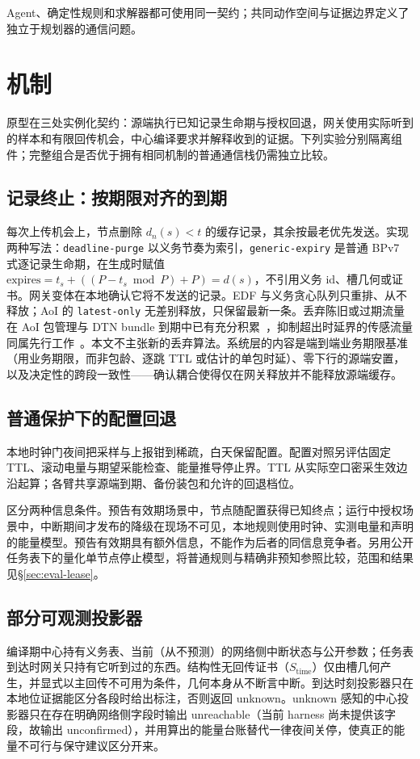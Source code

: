 \documentclass[11pt]{article}
\newcommand{\stime}{$S_{\mathrm{time}}$\xspace}
\begin{document}
Agent、确定性规则和求解器都可使用同一契约；共同动作空间与证据边界定义了独立于规划器的通信问题。

\section{机制}
\label{sec:mech}
原型在三处实例化契约：源端执行已知记录生命期与授权回退，网关使用实际听到的样本和有限回传机会，中心编译要求并解释收到的证据。下列实验分别隔离组件；完整组合是否优于拥有相同机制的普通通信栈仍需独立比较。

\subsection{记录终止：按期限对齐的到期}
\label{sec:mech-record}
每次上传机会上，节点删除 $d_n(s)<t$ 的缓存记录，其余按最老优先发送。实现两种写法：\texttt{deadline-purge} 以义务节奏为索引，\texttt{generic-expiry} 是普通 BPv7 式逐记录生命期，在生成时赋值 $\text{expires}=t_s+((P-t_s\bmod P)+P)=d(s)$，不引用义务 id、槽几何或证书。网关变体在本地确认它将不发送的记录。EDF 与义务贪心队列只重排、从不释放；AoI 的 \texttt{latest-only} 无差别释放，只保留最新一条。丢弃陈旧或过期流量在 AoI 包管理与 DTN bundle 到期中已有充分积累~\cite{costa2014pm,kam2016deadline,dtnarch,rfc9171}，抑制超出时延界的传感流量同属先行工作~\cite{wada2009timeout}。本文不主张新的丢弃算法。系统层的内容是端到端业务期限基准（用业务期限，而非包龄、逐跳 TTL 或估计的单包时延）、零下行的源端安置，以及决定性的跨段一致性——确认耦合使得仅在网关释放并不能释放源端缓存。

\subsection{普通保护下的配置回退}
\label{sec:mech-lease}
本地时钟门夜间把采样与上报钳到稀疏，白天保留配置。配置对照另评估固定 TTL、滚动电量与期望采能检查、能量推导停止界。TTL 从实际空口密采生效边沿起算；各臂共享源端到期、备份装包和允许的回退档位。

区分两种信息条件。预告有效期场景中，节点随配置获得已知终点；运行中授权场景中，中断期间才发布的降级在现场不可见，本地规则使用时钟、实测电量和声明的能量模型。预告有效期具有额外信息，不能作为后者的同信息竞争者。另用公开任务表下的量化单节点停止模型，将普通规则与精确非预知参照比较，范围和结果见\S\ref{sec:eval-lease}。

\subsection{部分可观测投影器}
\label{sec:mech-projector}
编译期中心持有义务表、当前（从不预测）的网络侧中断状态与公开参数；任务表到达时网关只持有它听到过的东西。结构性无回传证书（\stime）仅由槽几何产生，并显式以主回传不可用为条件，几何本身从不断言中断。到达时刻投影器只在本地位证据能区分各段时给出标注，否则返回 unknown。unknown 感知的中心投影器只在存在明确网络侧字段时输出 unreachable（当前 harness 尚未提供该字段，故输出 unconfirmed），并用算出的能量台账替代一律夜间关停，使真正的能量不可行与保守建议区分开来。
\end{document}
